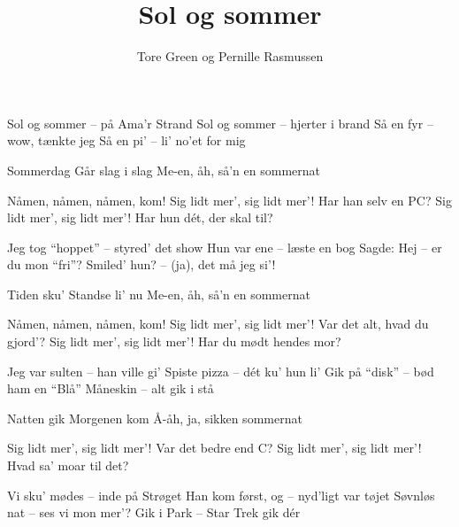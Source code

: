 \documentclass[10pt]{article}
\title{Sol og sommer}
\author{Tore Green og Pernille Rasmussen}
\begin{document}

\begin{song}
       Sol og sommer -- på Ama'r Strand
       Sol og sommer -- hjerter i brand
       Så en fyr -- wow, tænkte jeg
       Så en pi' -- li' no'et for mig

   Sommerdag
                Går slag i slag
                Me-en, åh, så'n en sommernat

     Nåmen, nåmen, nåmen, kom!
                Sig lidt mer', sig lidt mer'!
      Har han selv en PC?
     Sig lidt mer', sig lidt mer'!
      Har hun d\' et, der skal til?


       Jeg tog ``hoppet'' -- styred' det show
       Hun var ene -- læste en bog
       Sagde: Hej -- er du mon ``fri''?
       Smiled' hun? -- (ja), det må jeg si'!

   Tiden sku'
                Standse li' nu
                Me-en, åh, så'n en sommernat

     Nåmen, nåmen, nåmen, kom!
                Sig lidt mer', sig lidt mer'!
      Var det alt, hvad du gjord'?
     Sig lidt mer', sig lidt mer'!
      Har du mødt hendes mor?


       Jeg var sulten -- han ville gi'
       Spiste pizza -- d\' et ku' hun li'
       Gik på ``disk'' -- bød ham en ``Blå''
       Måneskin -- alt gik i stå

   Natten gik
                Morgenen kom
                Å-åh, ja, sikken sommernat


     Sig lidt mer', sig lidt mer'!
      Var det bedre end C?
     Sig lidt mer', sig lidt mer'!
      Hvad sa' moar til det?


       Vi sku' mødes -- inde på Strøget
       Han kom først, og -- nyd'ligt var tøjet
       Søvnløs nat -- ses vi mon mer'?
       Gik i Park -- Star Trek gik d\' er


\end{song}
\end{document}
